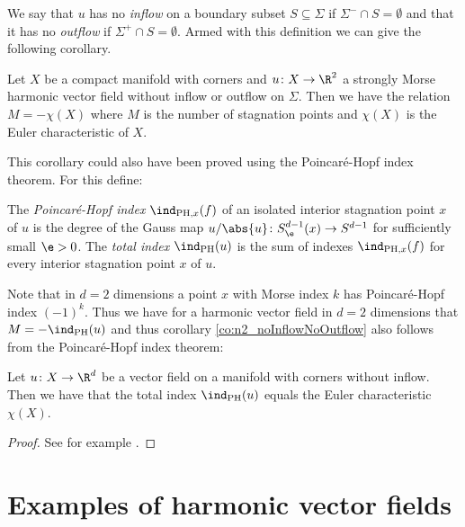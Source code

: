 We say that $u$ has no \emph{inflow} on a boundary subset $S\subseteq\Sigma$ if $\Sigma^-\cap S=\emptyset$ and
that it has no \emph{outflow} if $\Sigma^+\cap S=\emptyset$.
Armed with this definition we can give the following corollary.
\begin{corollary}\label{co:n2_noInflowNoOutflow}
  Let $X$ be a compact manifold with corners and $u\colon X\to\R^2$ a strongly Morse
  harmonic vector field without inflow or outflow on
  $\Sigma$. Then we have the relation $M=-\chi(X)$ where $M$ is the number of stagnation points
  and $\chi(X)$ is the Euler characteristic of $X$.
\end{corollary}
This corollary could also have been proved using the Poincaré-Hopf index theorem.
For this define:
\begin{definition}
  The \emph{Poincaré-Hopf index} $\ind_{\text{PH},x}(f)$ of an isolated
  interior stagnation point $x$ of $u$ is the degree of the Gauss map $u/\abs{u}\colon S^{d-1}_\e(x)\to S^{d-1}$
   for sufficiently small $\e>0$.
  The \emph{total index} $\ind_{\text{PH}}(u)$ is the sum of indexes $\ind_{\text{PH},x}(f)$
  for every interior stagnation point $x$ of $u$.
\end{definition}
Note that in $d=2$ dimensions a point $x$ with Morse index $k$ has Poincaré-Hopf index $(-1)^k$.
Thus we have for a harmonic vector field in $d=2$ dimensions that $M=-\ind_\text{PH}(u)$ and thus corollary \ref{co:n2_noInflowNoOutflow}
also follows from the Poincaré-Hopf index theorem:
\begin{theorem}
  Let $u\colon X\to\R^d$ be a vector field on a manifold with corners without inflow. Then we have
  that the total index $\ind_\text{PH}(u)$ equals the Euler characteristic $\chi(X)$.
\end{theorem}
\begin{proof}
  See for example \cite[§6]{Milnor1965}.
\end{proof}


\section{Examples of harmonic vector fields}

